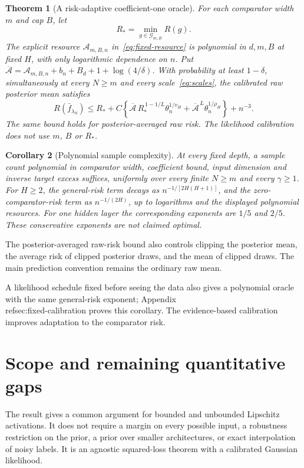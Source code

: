 \documentclass[11pt]{article}
\newtheorem{theorem}{Theorem}[section]\newtheorem{lemma}[theorem]{Lemma}
\newtheorem{corollary}[theorem]{Corollary}\newtheorem{proposition}[theorem]{Proposition}
\theoremstyle{remark}\newtheorem{remark}[theorem]{Remark}
\newcommand{\calG}{\mathcal G}
\begin{document}
\begin{theorem}[A risk-adaptive coefficient-one oracle]
\label{thm:oracle}
For each comparator width $m$ and cap $B$, let
\[
 R_*=\min_{g\in\calG_{m,B}}R(g).
\]
The explicit resource $\mathcal A_{m,B,n}$ in~\eqref{eq:fixed-resource} is polynomial in $d,m,B$ at fixed $H$, with only logarithmic dependence on $n$. Put
$\overline{\mathcal A}=\mathcal A_{m,B,n}+b_n+B_d+1+\log(4/\delta)$.
With probability at least $1-\delta$, simultaneously at every $N\ge m$ and every scale~\eqref{eq:scales}, the calibrated raw posterior mean satisfies
\begin{equation}
 R(\bar f_{\lambda_S})\le R_*+
 C\left\{\overline{\mathcal A}\,R_*^{\,1-1/L}\theta_n^{1/v_H}
       +\overline{\mathcal A}^{\,L}\theta_n^{1/\rho_H}\right\}
 +n^{-3}.
 \label{eq:oracle}
\end{equation}
The same bound holds for posterior-averaged raw risk.
The likelihood calibration does not use $m$, $B$ or $R_*$.
\end{theorem}

\begin{corollary}[Polynomial sample complexity]
At every fixed depth, a sample count polynomial in comparator width, coefficient bound, input dimension and inverse target excess suffices, uniformly over every finite $N\ge m$ and every $\gamma\ge1$. For $H\ge2$, the general-risk term decays as $n^{-1/[2H(H+1)]}$, and the zero-comparator-risk term as $n^{-1/(2H)}$, up to logarithms and the displayed polynomial resources. For one hidden layer the corresponding exponents are $1/5$ and $2/5$. These conservative exponents are not claimed optimal.
\end{corollary}

The posterior-averaged raw-risk bound also controls clipping the posterior mean, the average risk of clipped posterior draws, and the mean of clipped draws. The main prediction convention remains the ordinary raw mean.

A likelihood schedule fixed before seeing the data also gives a polynomial oracle with the same general-risk exponent; Appendix~\\ref{sec:fixed-calibration} proves this corollary. The evidence-based calibration improves adaptation to the comparator risk.







\section{Scope and remaining quantitative gaps}
The result gives a common argument for bounded and unbounded Lipschitz activations. It does not require a margin on every possible input, a robustness restriction on the prior, a prior over smaller architectures, or exact interpolation of noisy labels. It is an agnostic squared-loss theorem with a calibrated Gaussian likelihood.
\end{document}
